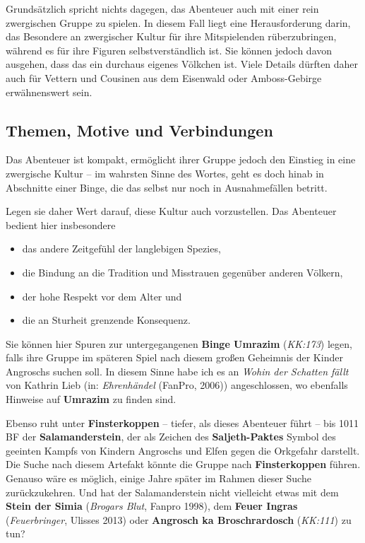 Grundsätzlich spricht nichts dagegen, das Abenteuer auch mit einer rein zwergischen Gruppe zu spielen.
In diesem Fall liegt eine Herausforderung darin,  das Besondere an zwergischer Kultur für ihre Mitspielenden rüberzubringen,
während es für ihre Figuren selbstverständlich ist.
Sie können jedoch davon ausgehen, dass das \fkv ein durchaus eigenes Völkchen ist.
Viele Details dürften daher auch für  Vettern und Cousinen aus dem Eisenwald oder Amboss-Gebirge erwähnenswert sein.

\subsection*{Themen, Motive und Verbindungen}
Das Abenteuer ist kompakt, ermöglicht  ihrer Gruppe jedoch den Einstieg in eine zwergische Kultur
-- im wahrsten Sinne des Wortes, geht es doch hinab in Abschnitte einer Binge,
die das \fkv selbst nur noch in  Ausnahmefällen betritt.

Legen sie daher Wert darauf, diese Kultur auch vorzustellen. Das Abenteuer bedient hier insbesondere
\begin{itemize}
	\item das andere Zeitgefühl der langlebigen Spezies,
	\item die Bindung an die Tradition und Misstrauen gegenüber anderen Völkern,
	\item der hohe Respekt vor dem Alter und
	\item die an Sturheit grenzende Konsequenz.
\end{itemize}

Sie können hier  Spuren zur untergegangenen \textbf{Binge Umrazim} (\emph{KK:173}) legen,
falls ihre Gruppe im späteren Spiel nach diesem großen Geheimnis der Kinder Angroschs suchen soll.
In diesem Sinne habe ich es an \emph{Wohin der Schatten fällt} von Kathrin Lieb (in: \emph{Ehrenhändel} (FanPro, 2006)) angeschlossen,
wo ebenfalls Hinweise auf \textbf{Umrazim} zu finden sind.

Ebenso ruht unter \textbf{Finsterkoppen} -- tiefer, als dieses Abenteuer führt -- bis 1011 BF der \textbf{Salamanderstein}, der als Zeichen des \textbf{Saljeth-Paktes} Symbol des geeinten Kampfs von Kindern Angroschs und Elfen gegen die Orkgefahr darstellt.
Die Suche nach diesem Artefakt könnte die Gruppe nach \textbf{Finsterkoppen} führen.
Genauso wäre es möglich, einige Jahre später im Rahmen dieser Suche zurückzukehren.
Und hat der Salamanderstein nicht vielleicht etwas mit dem \textbf{Stein der Simia} (\emph{Brogars Blut}, Fanpro 1998), dem \textbf{Feuer Ingras} (\emph{Feuerbringer}, Ulisses 2013) oder \textbf{Angrosch ka Broschrardosch} (\emph{KK:111}) zu tun?

